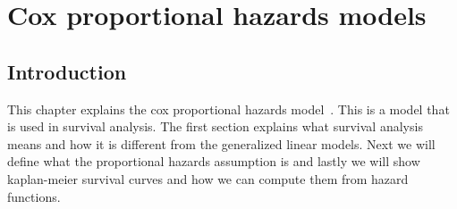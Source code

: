 \chapter{Cox proportional hazards models}
\label{cha:cox}

\section{Introduction}
\label{sec:cox-introduction}
This chapter explains the cox proportional hazards model~\cite{simon2011regularization}\cite{tibshirani1997lasso}\cite{wikicox}. This is a model that is used in survival analysis. The first section explains what survival analysis means and how it is different from the generalized linear models. Next we will define what the proportional hazards assumption is and lastly we will show kaplan-meier survival curves and how we can compute them from hazard functions.

